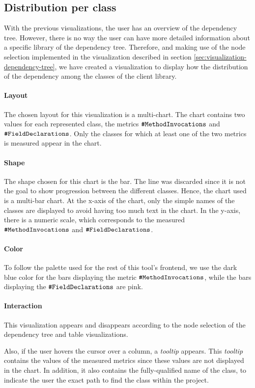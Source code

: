 \subsection{Distribution per class}
With the previous visualizations, the user has an overview of the dependency tree. However, there is no way the user can have more detailed information about a specific library of the dependency tree. Therefore, and making use of the node selection implemented in the visualization described in section \ref{sec:visualization-dependency-tree}, we have created a visualization to display how the distribution of the dependency among the classes of the client library.

\paragraph{Layout}
The chosen layout for this visualization is a multi-chart. The chart contains two values for each represented class, the metrics \(\verb|#MethodInvocations|\) and \(\verb|#FieldDeclarations|\).
Only the classes for which at least one of the two metrics is measured appear in the chart.

\paragraph{Shape}
The shape chosen for this chart is the bar. The line was discarded since it is not the goal to show progression between the different classes. Hence, the chart used is a multi-bar chart.
At the x-axis of the chart, only the simple names of the classes are displayed to avoid having too much text in the chart. In the y-axis, there is a numeric scale, which corresponds to the measured \(\verb|#MethodInvocations|\) and \(\verb|#FieldDeclarations|\).

\paragraph{Color}
To follow the palette used for the rest of this tool's frontend, we use the dark blue color for the bars displaying the metric \(\verb|#MethodInvocations|\), while the bars displaying the \(\verb|#FieldDeclarations|\) are pink.

\paragraph{Interaction}
This visualization appears and disappears according to the node selection of the dependency tree and table visualizations.

Also, if the user hovers the cursor over a column, a \textit{tooltip} appears. This \textit{tooltip} contains the values of the measured metrics since these values are not displayed in the chart. In addition, it also contains the fully-qualified name of the class, to indicate the user the exact path to find the class within the project.
